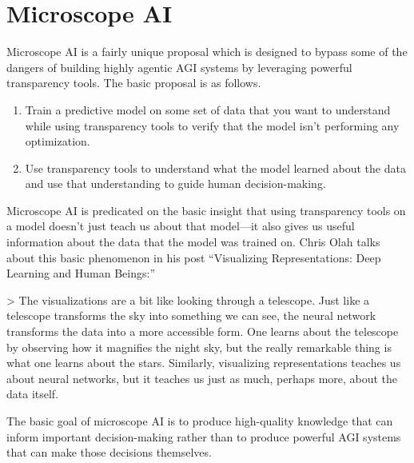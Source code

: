 \section{Microscope AI}
\label{sec:5}

Microscope AI\cite{TODO: cite https://www.alignmentforum.org/posts/X2i9dQQK3gETCyqh2/chris-olah-s-views-on-agi-safety} is a fairly unique proposal which is designed to bypass some of the dangers of building highly agentic AGI systems by leveraging powerful transparency tools. The basic proposal is as follows.

\begin{enumerate}
\item Train a predictive model on some set of data that you want to understand while using transparency tools to verify that the model isn't performing any optimization.
\item Use transparency tools to understand what the model learned about the data and use that understanding to guide human decision-making.
\end{enumerate}

Microscope AI is predicated on the basic insight that using transparency tools on a model doesn't just teach us about that model---it also gives us useful information about the data that the model was trained on. Chris Olah talks about this basic phenomenon in his post ``Visualizing Representations: Deep Learning and Human Beings\cite{TODO: cite https://colah.github.io/posts/2015-01-Visualizing-Representations/}:''

> The visualizations are a bit like looking through a telescope. Just like a telescope transforms the sky into something we can see, the neural network transforms the data into a more accessible form. One learns about the telescope by observing how it magnifies the night sky, but the really remarkable thing is what one learns about the stars. Similarly, visualizing representations teaches us about neural networks, but it teaches us just as much, perhaps more, about the data itself.

The basic goal of microscope AI is to produce high-quality knowledge that can inform important decision-making rather than to produce powerful AGI systems that can make those decisions themselves.

